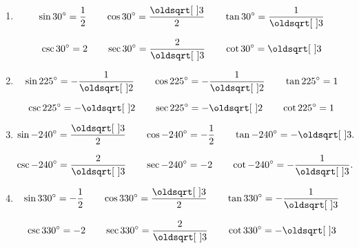 \documentclass[12pt]{article} %
\begin{document}
\begin{qstn} \texttt{  }
    \begin{enumerate}[label=(\alph*)]
      \item
        \[
            \sin 30^{\circ} = \frac{1}{2} \hspace{0.7cm} \cos 30^{\circ} = \frac{\sqrt{3}}{2} \hspace{0.7cm} 
            \tan 30^{\circ} = \frac{1}{\sqrt{3}}
        \] 

        \[
            \csc 30^{\circ} = 2 \hspace{0.7cm} \sec 30^{\circ} = \frac{2}{\sqrt{3}} \hspace{0.7cm} 
            \cot 30^{\circ} = \sqrt{3} 
        \] 

      \item
        \[
            \sin 225^{\circ} = -\frac{1}{\sqrt{2}} \hspace{0.7cm} \cos 225^{\circ} = -\frac{1}{\sqrt{2}} \hspace{0.7cm} 
            \tan 225^{\circ} = 1
        \] 

        \[
            \csc 225^{\circ} = -\sqrt{2}  \hspace{0.7cm} \sec 225^{\circ} = -\sqrt{2}  \hspace{0.7cm} 
            \cot 225^{\circ} = 1
        \] 

      \item
        \[
            \sin -240^{\circ} = \frac{\sqrt{3}}{2} \hspace{0.7cm} \cos -240^{\circ} = -\frac{1}{2} \hspace{0.7cm} 
            \tan -240^{\circ} = -\sqrt{3}. 
        \] 

        \[
            \csc -240^{\circ} = \frac{2}{\sqrt{3}} \hspace{0.7cm} \sec -240^{\circ} = -2 \hspace{0.7cm} 
            \cot -240^{\circ} = -\frac{1}{\sqrt{3}}. 
        \] 

      \item
        \[
            \sin 330^{\circ} = -\frac{1}{2} \hspace{0.7cm} \cos 330^{\circ} = \frac{\sqrt{3}}{2} \hspace{0.7cm} 
            \tan 330^{\circ} = -\frac{1}{\sqrt{3}}
        \] 

        \[
            \csc 330^{\circ} = -2 \hspace{0.7cm} \sec 330^{\circ} = \frac{2}{\sqrt{3}} \hspace{0.7cm} 
            \cot 330^{\circ} = -\sqrt{3} 
        \] 
      
    \end{enumerate}
\end{qstn}
\end{document}
